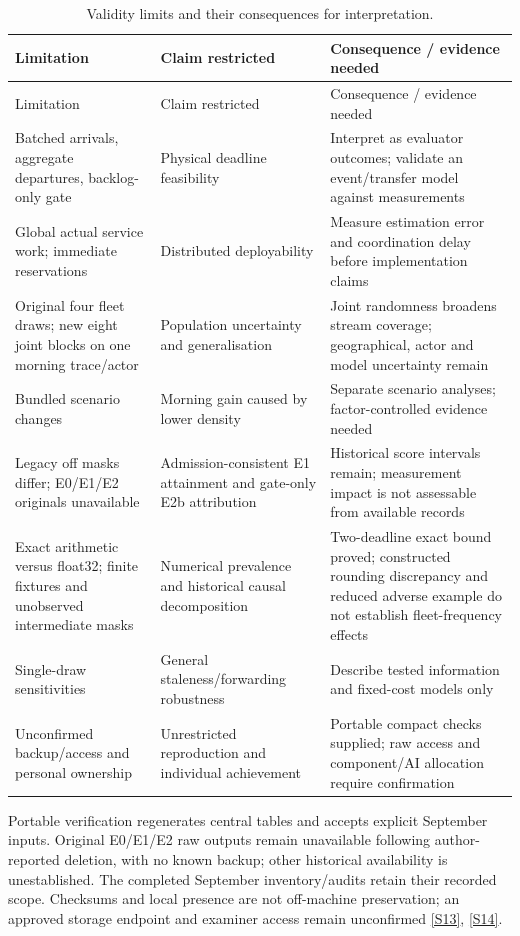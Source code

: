 \documentclass[11pt,a4paper]{article}
\begin{document}
\begingroup
\small
\begin{xltabular}{\textwidth}{@{}YYY@{}}
\caption{Validity limits and their consequences for interpretation.}\label{tab:12} \\
\toprule
Limitation & Claim restricted & Consequence / evidence needed \\
\midrule\endfirsthead
\toprule
Limitation & Claim restricted & Consequence / evidence needed \\
\midrule\endhead
\bottomrule\endfoot
Batched arrivals, aggregate departures, backlog-only gate & Physical deadline feasibility & Interpret as evaluator outcomes; validate an event/transfer model against measurements \\
Global actual service work; immediate reservations & Distributed deployability & Measure estimation error and coordination delay before implementation claims \\
Original four fleet draws; new eight joint blocks on one morning trace/actor & Population uncertainty and generalisation & Joint randomness broadens stream coverage; geographical, actor and model uncertainty remain \\
Bundled scenario changes & Morning gain caused by lower density & Separate scenario analyses; factor-controlled evidence needed \\
Legacy off masks differ; E0/E1/E2 originals unavailable & Admission-consistent E1 attainment and gate-only E2b attribution & Historical score intervals remain; measurement impact is not assessable from available records \\
Exact arithmetic versus float32; finite fixtures and unobserved intermediate masks & Numerical prevalence and historical causal decomposition & Two-deadline exact bound proved; constructed rounding discrepancy and reduced adverse example do not establish fleet-frequency effects \\
Single-draw sensitivities & General staleness/forwarding robustness & Describe tested information and fixed-cost models only \\
Unconfirmed backup/access and personal ownership & Unrestricted reproduction and individual achievement & Portable compact checks supplied; raw access and component/AI allocation require confirmation \\
\end{xltabular}
\endgroup

Portable verification regenerates central tables and accepts explicit September inputs. Original E0/E1/E2 raw outputs remain unavailable following author-reported deletion, with no known backup; other historical availability is unestablished. The completed September inventory/audits retain their recorded scope. Checksums and local presence are not off-machine preservation; an approved storage endpoint and examiner access remain unconfirmed \hyperref[source-s13]{[S13]}, \hyperref[source-s14]{[S14]}.
\end{document}
